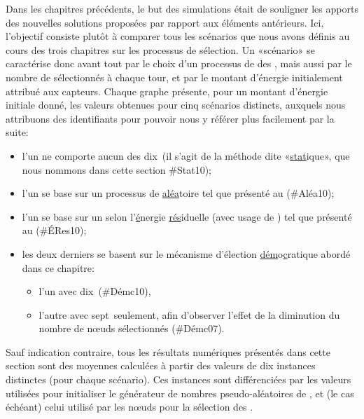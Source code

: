 \newcommand\idstat{\textsf{\#Stat10}\xspace}
\newcommand\idrand{\textsf{\#Aléa10}\xspace}
\newcommand\ideres{\textsf{\#ÉRes10}\xspace}
\newcommand\iddemx{\textsf{\#Démc10}\xspace}
\newcommand\iddems{\textsf{\#Démc07}\xspace}
Dans les chapitres précédents, le but des simulations était de souligner les apports des nouvelles solutions proposées par rapport aux éléments antérieurs.
Ici, l'objectif consiste plutôt à comparer tous les scénarios que nous avons définis au cours des trois chapitres sur les processus de sélection.
Un «scénario» se caractérise donc avant tout par le choix d'un processus de  des \cns, mais aussi par le nombre de \cns sélectionnés à chaque tour, et par le montant d'énergie initialement attribué aux capteurs.
Chaque graphe présente, pour un montant d'énergie initiale donné, les valeurs obtenues pour cinq scénarios distincts, auxquels nous attribuons des identifiants pour pouvoir nous y référer plus facilement par la suite:
\begin{itemize}
    \item l'un ne comporte aucun  des dix~\cns (il s'agit de la méthode dite «\underline{stat}ique», que nous nommons dans cette section \idstat);
    \item l'un se base sur un processus de  \underline{aléa}toire tel que présenté au  (\idrand);
    \item l'un se base sur un  selon l'\underline{é}nergie \underline{rés}iduelle (avec usage de \vns) tel que présenté au  (\ideres);
    \item les deux derniers se basent sur le mécanisme d'élection \underline{dém}o\underline{c}ratique abordé dans ce chapitre:
        \begin{itemize}
            \item l'un avec dix~\cns (\iddemx),
            \item l'autre avec sept~\cns seulement, afin d'observer l'effet de la diminution du nombre de nœuds sélectionnés (\iddems).
        \end{itemize}
\end{itemize}
Sauf indication contraire, tous les résultats numériques présentés dans cette section sont des moyennes calculées à partir des valeurs de dix instances distinctes (pour chaque scénario).
Ces instances sont différenciées par les valeurs utilisées pour initialiser le générateur de nombres pseudo-aléatoires de \nsii, et (le cas échéant) celui utilisé par les nœuds pour la sélection des \cns.

